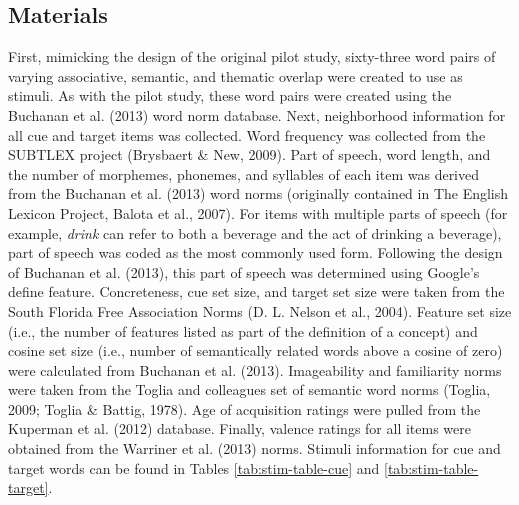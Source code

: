 \documentclass[english,man]{apa6}
\theoremstyle{definition}
\theoremstyle{definition}
\theoremstyle{definition}
\theoremstyle{remark}
\begin{document}
\subsection{Materials}\label{materials}

First, mimicking the design of the original pilot study, sixty-three
word pairs of varying associative, semantic, and thematic overlap were
created to use as stimuli. As with the pilot study, these word pairs
were created using the Buchanan et al. (2013) word norm database. Next,
neighborhood information for all cue and target items was collected.
Word frequency was collected from the SUBTLEX project (Brysbaert \& New,
2009). Part of speech, word length, and the number of morphemes,
phonemes, and syllables of each item was derived from the Buchanan et
al. (2013) word norms (originally contained in The English Lexicon
Project, Balota et al., 2007). For items with multiple parts of speech
(for example, \emph{drink} can refer to both a beverage and the act of
drinking a beverage), part of speech was coded as the most commonly used
form. Following the design of Buchanan et al. (2013), this part of
speech was determined using Google's define feature. Concreteness, cue
set size, and target set size were taken from the South Florida Free
Association Norms (D. L. Nelson et al., 2004). Feature set size (i.e.,
the number of features listed as part of the definition of a concept)
and cosine set size (i.e., number of semantically related words above a
cosine of zero) were calculated from Buchanan et al. (2013).
Imageability and familiarity norms were taken from the Toglia and
colleagues set of semantic word norms (Toglia, 2009; Toglia \& Battig,
1978). Age of acquisition ratings were pulled from the Kuperman et al.
(2012) database. Finally, valence ratings for all items were obtained
from the Warriner et al. (2013) norms. Stimuli information for cue and
target words can be found in Tables \ref{tab:stim-table-cue} and
\ref{tab:stim-table-target}.
\end{document}
